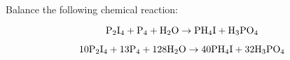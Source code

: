 

Balance the following chemical reaction:

$$\hbox{P}_2\hbox{I}_4 + \hbox{P}_4 + \hbox{H}_2\hbox{O} \to \hbox{PH}_4\hbox{I} + \hbox{H}_3\hbox{PO}_4$$







$$10\hbox{P}_2\hbox{I}_4 + 13\hbox{P}_4 + 128\hbox{H}_2\hbox{O} \to 40\hbox{PH}_4\hbox{I} + 32\hbox{H}_3\hbox{PO}_4$$











